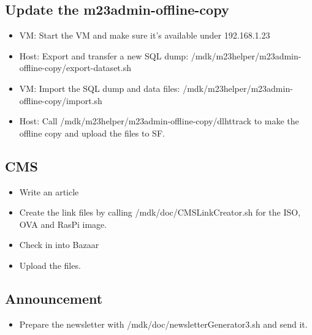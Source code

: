 \subsection{Update the m23admin-offline-copy}
	\begin{itemize}
		\item VM: Start the VM and make sure it's available under 192.168.1.23
		\item Host: Export and transfer a new SQL dump: /mdk/m23helper/m23admin-offline-copy/export-dataset.sh
		\item VM: Import the SQL dump and data files: /mdk/m23helper/m23admin-offline-copy/import.sh
		\item Host: Call /mdk/m23helper/m23admin-offline-copy/dlhttrack to make the offline copy and upload the files to SF.
	\end{itemize}


\subsection{CMS}
\begin{itemize}
	\item Write an article
	\item Create the link files by calling /mdk/doc/CMSLinkCreator.sh for the ISO, OVA and RasPi image.
	\item Check in into Bazaar
	\item Upload the files.
\end{itemize}


\subsection{Announcement}
\begin{itemize}
	\item Prepare the newsletter with /mdk/doc/newsletterGenerator3.sh and send it.
\end{itemize}